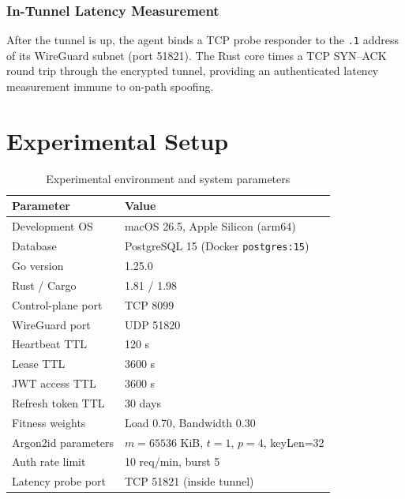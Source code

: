 \documentclass[12pt,a4paper]{report}
\begin{document}
\subsection{In-Tunnel Latency Measurement}

After the tunnel is up, the agent binds a TCP probe responder to the \texttt{.1} address of its WireGuard subnet (port 51821). The Rust core times a TCP SYN--ACK round trip through the encrypted tunnel, providing an authenticated latency measurement immune to on-path spoofing.

\chapter{Experimental Setup}

\begin{table}[H]
\centering\small
\caption{Experimental environment and system parameters}
\label{tab:env}
\begin{tabular}{ll}
\toprule
\textbf{Parameter} & \textbf{Value}\\
\midrule
Development OS              & macOS 26.5, Apple Silicon (arm64)\\
Database                    & PostgreSQL 15 (Docker \texttt{postgres:15})\\
Go version                  & 1.25.0\\
Rust / Cargo                & 1.81 / 1.98\\
Control-plane port          & TCP 8099\\
WireGuard port              & UDP 51820\\
Heartbeat TTL               & 120 s\\
Lease TTL                   & 3600 s\\
JWT access TTL              & 3600 s\\
Refresh token TTL           & 30 days\\
Fitness weights             & Load 0.70, Bandwidth 0.30\\
Argon2id parameters         & $m=65536$ KiB, $t=1$, $p=4$, keyLen=32\\
Auth rate limit             & 10 req/min, burst 5\\
Latency probe port          & TCP 51821 (inside tunnel)\\
\bottomrule
\end{tabular}
\end{table}
\end{document}
